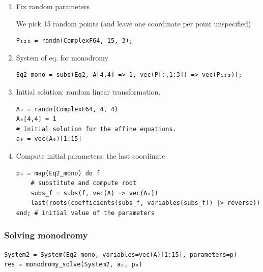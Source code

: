 \documentclass[11pt]{article}
\begin{document}
\begin{enumerate}
\item Fix random parameters
\label{sec:org194e4d9}

We pick 15 random points (and leave one coordinate per point unspecified)

\begin{verbatim}
P₁₂₃ = randn(ComplexF64, 15, 3);
\end{verbatim}

\item System of eq. for monodromy
\label{sec:orgcfae20f}

\begin{verbatim}
Eq2_mono = subs(Eq2, A[4,4] => 1, vec(P[:,1:3]) => vec(P₁₂₃));
\end{verbatim}

\item Initial solution: random linear transformation.
\label{sec:org5a3a5cb}

\begin{verbatim}
A₀ = randn(ComplexF64, 4, 4)
A₀[4,4] = 1
# Initial solution for the affine equations.
a₀ = vec(A₀)[1:15]
\end{verbatim}

\item Compute initial parameters: the last coordinate
\label{sec:org41ec9ea}

\begin{verbatim}
p₀ = map(Eq2_mono) do f
    # substitute and compute root
    subs_f = subs(f, vec(A) => vec(A₀))
    last(roots(coefficients(subs_f, variables(subs_f)) |> reverse))
end; # initial value of the parameters
\end{verbatim}
\end{enumerate}

\subsubsection{Solving monodromy}
\label{sec:org3f552a9}

\begin{verbatim}
System2 = System(Eq2_mono, variables=vec(A)[1:15], parameters=p)
res = monodromy_solve(System2, a₀, p₀)
\end{verbatim}
\end{document}
